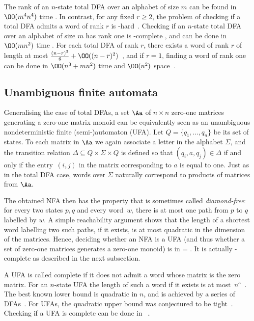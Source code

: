 The rank of an $n$-state total DFA over an alphabet of size $m$ can be found in $\OO(m^4n^4)$ time \cite[Theorem 1]{Rystsov1992Rank}.
In contrast, for any fixed $r \ge 2$, the problem of checking if a total DFA admits a word of rank $r$ is \NP-hard~\cite{GORALCIK1995}. Checking if an $n$-state total DFA over an alphabet of size $m$ has rank one is \NL-complete \cite{Holzer2018,Volkov2022}, and can be done in $\OO(m n^2)$ time \cite{Eppstein1990,Volkov2008}. For each total DFA of rank $r$, there exists a word of rank $r$ of length at most $\frac{(n - r)^3}{6} + \OO((n - r)^2)$~\cite{Klyachko1987}, and if $r = 1$,  finding a word of rank one can be done in $\OO(n^3 + mn^2)$ time and $\OO(n^2)$ space~\cite{Eppstein1990}.

\subsection{Unambiguous finite automata}

Generalising the case of total DFAs, a set $\Aa$ of $n \times n$ zero-one matrices generating a zero-one matrix monoid can be equivalently seen as an unambiguous nondeterministic finite (semi-)automaton (UFA). Let $Q = \{q_1, \ldots, q_n\}$ be its set of states. To each matrix in $\Aa$ we again associate a letter in the alphabet $\Sigma$, and the transition relation $\Delta \subseteq Q \times \Sigma \times Q$ is defined so that $(q_i,a,q_j) \in \Delta$ if and only if the entry~$(i, j)$ in the matrix corresponding to $a$ is equal to one. Just as in the total DFA case, words over $\Sigma$ naturally correspond to products of matrices from $\Aa$.

The obtained NFA then has the property that is sometimes called \emph{diamond-free}: for every two states $p, q$ and every word~$w$, there is at most one path from $p$ to $q$ labelled by $w$. A simple reachability argument shows that the length of a shortest word labelling two such paths, if it exists, is at most quadratic in the dimension of the matrices. Hence, deciding whether an NFA is a UFA (and thus whether a set of zero-one matrices generates a zero-one monoid)  is in \coNL = \NL. It is actually \NL-complete as described in the next subsection.

A UFA is called complete if it does not admit a word whose matrix is the zero matrix. For an $n$-state UFA the length of such a word if it exists is at most~$n^5$~\cite{Kiefer2021}. 
The best known lower bound is quadratic in $n$, and is achieved by a series of DFAs~\cite{Rystsov1997}. 
For UFAs, the quadratic upper bound was conjectured to be tight~\cite[Conjecture 2]{Rystsov1992Rank}. Checking if a UFA is complete can be done in \NCT~\cite{Kiefer2021}. 

